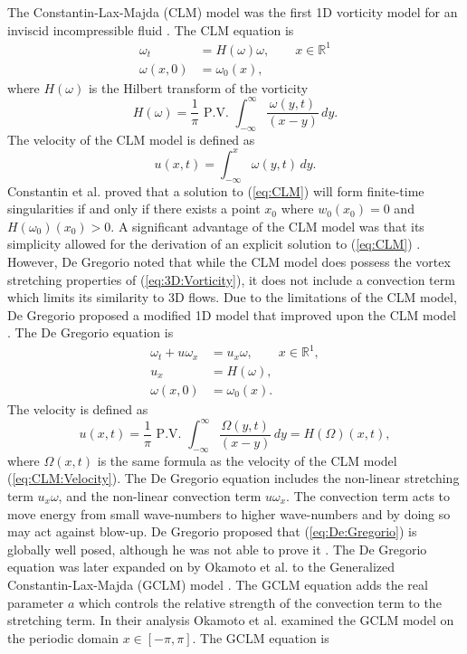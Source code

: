 \documentclass[12pt]{article}
\def\w{\omega}
\def\wt{\omega_t}
\def\wx{\omega_x}
\def\ux{u_x}
\def\R{\mathbb{R}}
\numberwithin{equation}{section}
\begin{document}
The Constantin-Lax-Majda (CLM) model was the first 1D vorticity model for an inviscid incompressible fluid \cite{constantin_simple_1985}. The CLM equation is
\begin{subequations}\label{eq:CLM}
\begin{align}
\wt &= H(\w)\w, \qquad x\in \R^1\\
\w(x,0) &= \w_0(x),
\end{align}
\end{subequations}
where $H(\w)$ is the Hilbert transform of the vorticity
\begin{equation}
H(\w) = \frac{1}{\pi}\text{ P.V. } \int_{-\infty}^{\infty} \frac{\w(y,t)}{(x-y)}\,dy.
\end{equation}
The velocity of the CLM model is defined as 
\begin{equation}\label{eq:CLM:Velocity}
u(x,t) = \int_{-\infty}^x \w(y,t)\,dy.
\end{equation}
Constantin et al. proved that a solution to (\ref{eq:CLM}) will form finite-time singularities if and only if there exists a point $x_0$ where $w_0(x_0)=0$ and $H(\w_0)(x_0)>0$. A significant advantage of the CLM model was that its simplicity allowed for the derivation of an explicit solution to (\ref{eq:CLM}) \cite{constantin_simple_1985}. However, De Gregorio noted that while the CLM model does possess the vortex stretching properties of (\ref{eq:3D:Vorticity}), it does not include a convection term which limits its similarity to 3D flows. Due to the limitations of the CLM model, De Gregorio proposed a modified 1D model that improved upon the CLM model \cite{de_gregorio_one-dimensional_1990}. The De Gregorio equation is
\begin{subequations}\label{eq:De:Gregorio}
\begin{align}
\wt + u\wx &= \ux\w, \qquad x\in\R^1, \\
u_x &= H(\w), \\
\w(x,0) &= \w_0(x).
\end{align}
\end{subequations}
The velocity is defined as
\begin{equation}
u(x,t) = \frac{1}{\pi}\text{ P.V. }\int_{-\infty}^{\infty}\frac{\Omega(y,t)}{(x-y)}\,dy = H(\Omega)(x,t),
\end{equation}
where $\Omega(x,t)$ is the same formula as the velocity of the CLM model (\ref{eq:CLM:Velocity}). The De Gregorio equation includes the non-linear stretching term $u_x\w$, and the non-linear convection term $u\wx$. The convection term acts to move energy from small wave-numbers to higher wave-numbers and by doing so may act against blow-up. De Gregorio proposed that (\ref{eq:De:Gregorio}) is globally well posed, although he was not able to prove it \cite{de_gregorio_partial_1996}. The De Gregorio equation was later expanded on by Okamoto et al. to the Generalized Constantin-Lax-Majda (GCLM) model \cite{okamoto_generalization_2008}. The GCLM equation adds the real parameter $a$ which controls the relative strength of the convection term to the stretching term. In their analysis Okamoto et al. examined the GCLM model on the periodic domain $x\in[-\pi,\pi]$. The GCLM equation is
\end{document}
